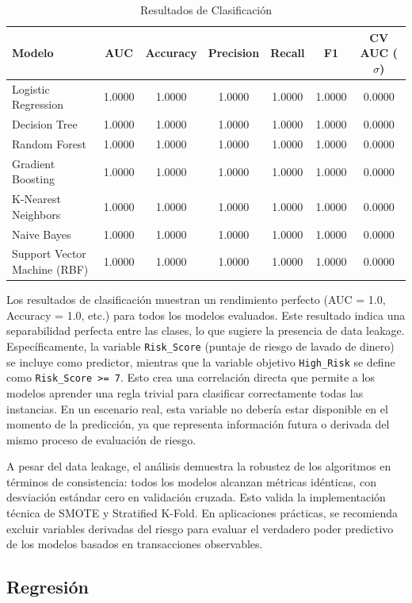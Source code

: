 \documentclass[12pt]{article}
\begin{document}
\begin{table}[h]
\centering
\begin{tabular}{@{}lcccccc@{}}
\toprule
Modelo & AUC & Accuracy & Precision & Recall & F1 & CV AUC ($\sigma$) \\
\midrule
Logistic Regression & 1.0000 & 1.0000 & 1.0000 & 1.0000 & 1.0000 & 0.0000 \\
Decision Tree & 1.0000 & 1.0000 & 1.0000 & 1.0000 & 1.0000 & 0.0000 \\
Random Forest & 1.0000 & 1.0000 & 1.0000 & 1.0000 & 1.0000 & 0.0000 \\
Gradient Boosting & 1.0000 & 1.0000 & 1.0000 & 1.0000 & 1.0000 & 0.0000 \\
K-Nearest Neighbors & 1.0000 & 1.0000 & 1.0000 & 1.0000 & 1.0000 & 0.0000 \\
Naive Bayes & 1.0000 & 1.0000 & 1.0000 & 1.0000 & 1.0000 & 0.0000 \\
Support Vector Machine (RBF) & 1.0000 & 1.0000 & 1.0000 & 1.0000 & 1.0000 & 0.0000 \\
\bottomrule
\end{tabular}
\caption{Resultados de Clasificación}
\end{table}

Los resultados de clasificación muestran un rendimiento perfecto (AUC = 1.0, Accuracy = 1.0, etc.) para todos los modelos evaluados. Este resultado indica una separabilidad perfecta entre las clases, lo que sugiere la presencia de data leakage. Específicamente, la variable \texttt{Risk\_Score} (puntaje de riesgo de lavado de dinero) se incluye como predictor, mientras que la variable objetivo \texttt{High\_Risk} se define como \texttt{Risk\_Score >= 7}. Esto crea una correlación directa que permite a los modelos aprender una regla trivial para clasificar correctamente todas las instancias. En un escenario real, esta variable no debería estar disponible en el momento de la predicción, ya que representa información futura o derivada del mismo proceso de evaluación de riesgo.

A pesar del data leakage, el análisis demuestra la robustez de los algoritmos en términos de consistencia: todos los modelos alcanzan métricas idénticas, con desviación estándar cero en validación cruzada. Esto valida la implementación técnica de SMOTE y Stratified K-Fold. En aplicaciones prácticas, se recomienda excluir variables derivadas del riesgo para evaluar el verdadero poder predictivo de los modelos basados en transacciones observables.

\subsection{Regresión}
\end{document}
